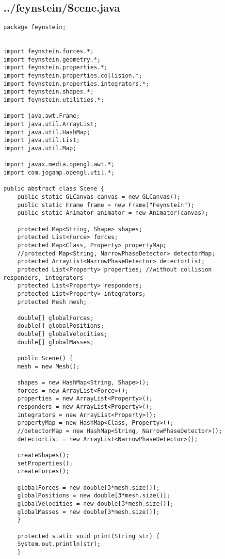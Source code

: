 \subsection*{../feynstein/Scene.java}
\begin{lstlisting}
package feynstein;


import feynstein.forces.*;
import feynstein.geometry.*;
import feynstein.properties.*;
import feynstein.properties.collision.*;
import feynstein.properties.integrators.*;
import feynstein.shapes.*;
import feynstein.utilities.*;

import java.awt.Frame;
import java.util.ArrayList;
import java.util.HashMap;
import java.util.List;
import java.util.Map;

import javax.media.opengl.awt.*;
import com.jogamp.opengl.util.*;

public abstract class Scene {
    public static GLCanvas canvas = new GLCanvas();
    public static Frame frame = new Frame("Feynstein");
    public static Animator animator = new Animator(canvas);

    protected Map<String, Shape> shapes;
    protected List<Force> forces;
    protected Map<Class, Property> propertyMap;
    //protected Map<String, NarrowPhaseDetector> detectorMap;
    protected ArrayList<NarrowPhaseDetector> detectorList;
    protected List<Property> properties; //without collision responders, integrators
    protected List<Property> responders;
    protected List<Property> integrators;
    protected Mesh mesh;
	
    double[] globalForces;
    double[] globalPositions;
    double[] globalVelocities;
    double[] globalMasses;

    public Scene() {
	mesh = new Mesh();

	shapes = new HashMap<String, Shape>();
	forces = new ArrayList<Force>();
	properties = new ArrayList<Property>();
	responders = new ArrayList<Property>();
	integrators = new ArrayList<Property>();
	propertyMap = new HashMap<Class, Property>();
	//detectorMap = new HashMap<String, NarrowPhaseDetector>();
	detectorList = new ArrayList<NarrowPhaseDetector>();

	createShapes();
	setProperties();
	createForces();
		
	globalForces = new double[3*mesh.size()];
	globalPositions = new double[3*mesh.size()];
	globalVelocities = new double[3*mesh.size()];
	globalMasses = new double[3*mesh.size()];
    }

    protected static void print(String str) {
	System.out.println(str);
    }


\end{lstlisting}
